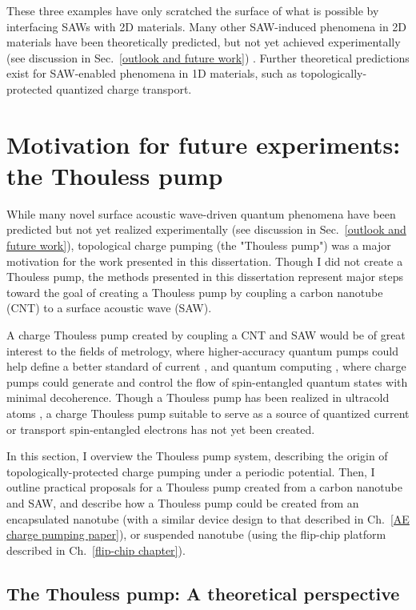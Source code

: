 \documentclass[double,12pt,1in,seploa]{beavtex}
\let\Oldsection\section
\renewcommand{\section}{\FloatBarrier\Oldsection}
\let\Oldsubsection\subsection
\renewcommand{\subsection}{\FloatBarrier\Oldsubsection}
\begin{document}
These three examples have only scratched the surface of what is possible by interfacing SAWs with 2D materials. Many other SAW-induced phenomena in 2D materials have been theoretically predicted, but not yet achieved experimentally (see discussion in Sec.\ \ref{outlook and future work}) \cite{nie_surface_2023}. Further theoretical predictions exist for SAW-enabled phenomena in 1D materials, such as topologically-protected quantized charge transport.

\section{Motivation for future experiments: the Thouless pump} \label{Thouless pump intro chapter}

While many novel surface acoustic wave-driven quantum phenomena have been predicted but not yet realized experimentally (see discussion in Sec.\ \ref{outlook and future work}), topological charge pumping (the "Thouless pump") was a major motivation for the work presented in this dissertation. Though I did not create a Thouless pump, the methods presented in this dissertation represent major steps toward the goal of creating a Thouless pump by coupling a carbon nanotube (CNT) to a surface acoustic wave (SAW).

A charge Thouless pump created by coupling a CNT and SAW would be of great interest to the fields of metrology, where higher-accuracy quantum pumps could help define a better standard of current \cite{pekola_single-electron_2013,scherer_singleelectron_2019}, and quantum computing \cite{das_controlled_2006}, where charge pumps could generate and control the flow of spin-entangled quantum states with minimal decoherence. Though a Thouless pump has been realized in ultracold atoms \cite{citro_thouless_2023}, a charge Thouless pump suitable to serve as a source of quantized current or transport spin-entangled electrons has not yet been created. 

In this section, I overview the Thouless pump system, describing the origin of topologically-protected charge pumping under a periodic potential. Then, I outline practical proposals for a Thouless pump created from a carbon nanotube and SAW, and describe how a Thouless pump could be created from an encapsulated nanotube (with a similar device design to that described in Ch.\ \ref{AE charge pumping paper}), or suspended nanotube (using the flip-chip platform described in Ch.\ \ref{flip-chip chapter}).

\subsection{The Thouless pump: A theoretical perspective}
\end{document}

